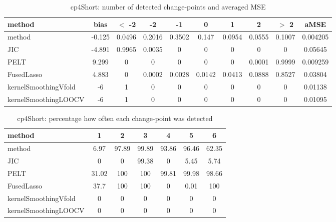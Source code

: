 \begin{table}[ht]
\centering
\begin{tabular}{l|c|ccccccc|c}
  \hline
method & bias & $<$ -2 & -2 & -1 & 0 & 1 & 2 & $>$ 2 & aMSE \\ 
  \hline
method & -0.125 & 0.0496 & 0.2016 & 0.3502 & 0.147 & 0.0954 & 0.0555 & 0.1007 & 0.004205 \\ 
  JIC & -4.891 & 0.9965 & 0.0035 &     0 &     0 &     0 &     0 &     0 & 0.05645 \\ 
  PELT & 9.299 &     0 &     0 &     0 &     0 &     0 & 0.0001 & 0.9999 & 0.009259 \\ 
  FusedLasso & 4.883 &     0 & 0.0002 & 0.0028 & 0.0142 & 0.0413 & 0.0888 & 0.8527 & 0.03804 \\ 
  kernelSmoothingVfold &    -6 &     1 &     0 &     0 &     0 &     0 &     0 &     0 & 0.01138 \\ 
  kernelSmoothingLOOCV &    -6 &     1 &     0 &     0 &     0 &     0 &     0 &     0 & 0.01095 \\ 
   \hline
\end{tabular}
\caption{cp4Short: number of detected change-points and averaged MSE} 
\label{tab:cp4ShortNjumps}
\end{table}
\begin{table}[ht]
\centering
\begin{tabular}{l|cccccc}
  \hline
method & 1 & 2 & 3 & 4 & 5 & 6 \\ 
  \hline
method &   6.97 &  97.89 &  99.89 &  93.86 &  96.46 &  62.35 \\ 
  JIC &      0 &      0 &  99.38 &      0 &   5.45 &   5.74 \\ 
  PELT &  31.02 &    100 &    100 &  99.81 &  99.98 &  98.66 \\ 
  FusedLasso &   37.7 &    100 &    100 &      0 &   0.01 &    100 \\ 
  kernelSmoothingVfold &      0 &      0 &      0 &      0 &      0 &      0 \\ 
  kernelSmoothingLOOCV &      0 &      0 &      0 &      0 &      0 &      0 \\ 
   \hline
\end{tabular}
\caption{cp4Short: percentage how often each change-point was detected} 
\label{tab:cp4ShortDetections}
\end{table}
